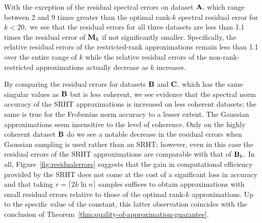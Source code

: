 With the exception of the residual spectral errors on dataset ${\bm{\mathrm{A}}},$ which range between 2 and 9 times greater than the optimal rank-$k$ spectral residual error for $k < 20,$ we see that the residual errors for all three datasets are less than 1.1 times the residual error of ${\bm{\mathrm{M}}}_k$ if not significantly smaller. Specifically, the relative residual errors of the restricted-rank approximations remain less than 1.1 over the entire range of $k$ while the relative residual errors of the non-rank-restricted approximations actually decrease as $k$ increases.

By comparing the residual errors for datasets ${\bm{\mathrm{B}}}$ and ${\bm{\mathrm{C}}},$ which has the same singular values as ${\bm{\mathrm{B}}}$ but is less coherent, we see evidence that the spectral norm accuracy of the SRHT approximations is increased on less coherent datasets; the same is true for the Frobenius norm accuracy to a lesser extent. The Gaussian approximations seem insensitive to the level of coherence. Only on the highly coherent dataset ${\bm{\mathrm{B}}}$ do we see a notable decrease in the residual errors when Gaussian sampling is used rather than an SRHT; however, even in this case the residual errors of the SRHT approximations are comparable with that of ${\bm{\mathrm{B}}}_k.$ In all, Figure~\ref{fig:residualerrors} suggests that the gain in computational efficiency provided by the SRHT does not come at the cost of a significant loss in accuracy and that taking $r = \lceil 2 k \ln n \rceil$ samples suffices to obtain approximations with small residual errors relative to those of the optimal rank-$k$ approximations. Up to the specific
value of the constant, this latter observation coincides with the conclusion of Theorem~\ref{thm:quality-of-approximation-guarantee}.

